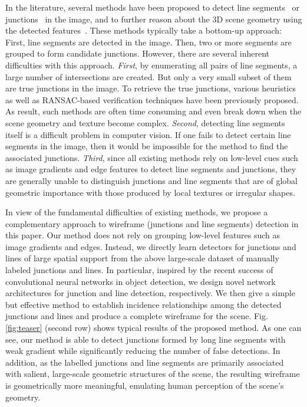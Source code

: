 \documentclass[10pt,twocolumn,letterpaper]{article}
\begin{document}
In the literature, several methods have been proposed to detect line segments~\cite{von2012lsd} or junctions~\cite{RamalingamPJT13,XiaDG14} in the image, and to further reason about the 3D scene geometry using the detected features~\cite{LeeHK09, FlintMR11, ElqurshE11, RamalingamB13, Yang16}. These methods typically take a bottom-up approach: First, line segments are detected in the image. Then, two or more segments are grouped to form candidate junctions. However, there are several inherent difficulties with this approach. \emph{First}, by enumerating all pairs of line segments, a large number of intersections are created. But only a very small subset of them are true junctions in the image. To retrieve the true junctions, various heuristics as well as RANSAC-based verification techniques have been previously proposed. As result, such methods are often time consuming and even break down when the scene geometry and texture become complex. \emph{Second}, detecting line segments itself is a difficult problem in computer vision. If one fails to detect certain line segments in the image, then it would be impossible for the method to find the associated junctions. \emph{Third}, since all existing methods rely on low-level cues such as image gradients and edge features to detect line segments and junctions, they are generally unable to distinguish junctions and line segments that are of global geometric importance with those produced by local textures or irregular shapes.



In view of the fundamental difficulties of existing methods, we propose a complementary approach to wireframe (junctions and line segments) detection in this paper. Our method does not rely on grouping low-level features such as image gradients and edges. Instead, we directly learn detectors for junctions and lines of large spatial support from the above large-scale dataset of manually labeled junctions and lines. In particular, inspired by the recent success of convolutional neural networks in object detection, we design novel network architectures for junction and line detection, respectively. We then give a simple but effective method to establish incidence relationships among the detected junctions and lines and produce a complete wireframe for the scene. Fig. \ref{fig:teaser} (second row) shows typical results of the proposed method. As one can see, our method is able to detect junctions formed by long line segments with weak gradient while significantly reducing the number of false detections. In addition, as the labelled junctions and line segments are primarily associated with salient, large-scale geometric structures of the scene, the resulting wireframe is geometrically more meaningful, emulating human perception of the scene's geometry.
\end{document}
